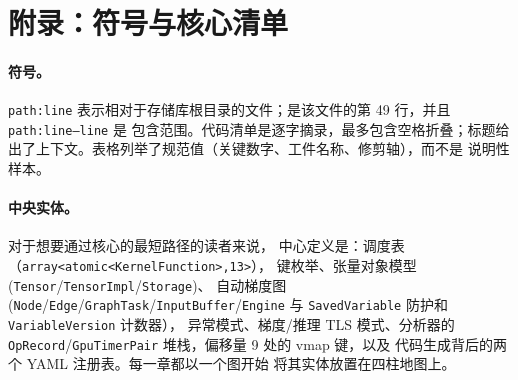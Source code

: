 \section*{附录：符号与核心清单}

\paragraph{符号。}
\texttt{path:line} 表示相对于存储库根目录的文件；是该文件的第 49 行，并且 \texttt{path:line--line} 是
包含范围。代码清单是逐字摘录，最多包含空格折叠；标题给出了上下文。表格列举了规范值（关键数字、工件名称、修剪轴），而不是
说明性样本。

\paragraph{中央实体。}
对于想要通过核心的最短路径的读者来说，
中心定义是：调度表（\texttt{array<atomic<KernelFunction>,13>}），
键枚举、张量对象模型 (\texttt{Tensor}/\texttt{TensorImpl}/\texttt{Storage})、
自动梯度图 (\texttt{Node}/\texttt{Edge}/\texttt{GraphTask}/\texttt{InputBuffer}/\texttt{Engine}
与 \texttt{SavedVariable} 防护和 \texttt{VariableVersion} 计数器），
异常模式、梯度/推理 TLS 模式、分析器的
\texttt{OpRecord}/\texttt{GpuTimerPair} 堆栈，偏移量 9 处的 vmap 键，以及
代码生成背后的两个 YAML 注册表。每一章都以一个图开始
将其实体放置在四柱地图上。